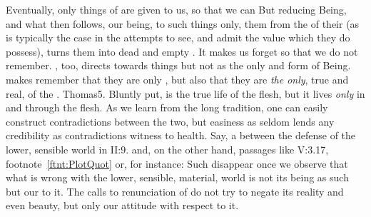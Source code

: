 \pa Eventually, only  things of  are given to us, so
that we can  But reducing Being, and what
then follows, our being, to such things only,  them from the
 of their  (as is typically the case in the attempts
to see,  and admit the value which they do possess), turns them
into dead and empty . It makes us forget so that we do not remember.
, too, directs  towards  things but not as
the only and  form of Being.  makes 
remember that they are only , but also that they are {\em the only},
true and real,  of the .  \citet{Know what is in front
of your face, and what is hidden from you will be disclosed to
you.}{Thomas}{5. {Bluntly put,  is the true life of the flesh, but it
lives {\em only} in and through the flesh. As we learn from the long tradition, one
can easily construct contradictions between the two, but easiness as seldom lends
any credibility as contradictions witness to health. Say, a
 between the defense of the lower, sensible 
world in \citeauthor*{Plotinus}{ II:9.} and, on
the other hand, passages like V:3.17, footnote~\ref{ftnt:PlotQuot} or, for
instance:  Such  disappear
once we observe that what is wrong with the lower, sensible, material,
 world is not its being as such but our  to it. The
calls to renunciation of  do not try to negate its reality and
even beauty, but only our  attitude with respect to it.}}




